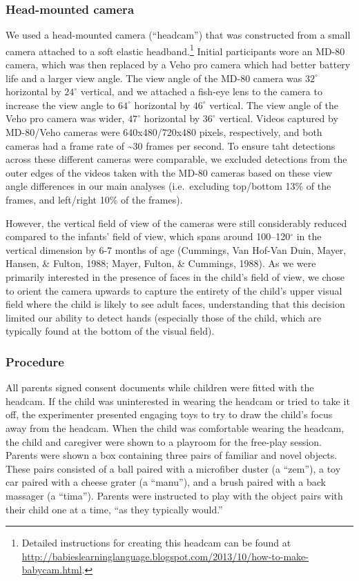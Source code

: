 \documentclass[english,man]{apa6}
\begin{document}
\subsubsection{Head-mounted camera}\label{head-mounted-camera}

We used a head-mounted camera (\enquote{headcam}) that was constructed
from a small camera attached to a soft elastic headband.\footnote{Detailed
  instructions for creating this headcam can be found at
  \url{http://babieslearninglanguage.blogspot.com/2013/10/how-to-make-babycam.html}.}
Initial participants wore an MD-80 camera, which was then replaced by a
Veho pro camera which had better battery life and a larger view angle.
The view angle of the MD-80 camera was \(32^{\circ}\) horizontal by
\(24^{\circ}\) vertical, and we attached a fish-eye lens to the camera
to increase the view angle to \(64^{\circ}\) horizontal by
\(46^{\circ}\) vertical. The view angle of the Veho pro camera was
wider, \(47^{\circ}\) horizontal by \(36^{\circ}\) vertical. Videos
captured by MD-80/Veho cameras were 640x480/720x480 pixels,
respectively, and both cameras had a frame rate of \textasciitilde{}30
frames per second. To ensure taht detections across these different
cameras were comparable, we excluded detections from the outer edges of
the videos taken with the MD-80 cameras based on these view angle
differences in our main analyses (i.e.~excluding top/bottom 13\% of the
frames, and left/right 10\% of the frames).

However, the vertical field of view of the cameras were still
considerably reduced compared to the infants' field of view, which spans
around 100--120\(^{\circ}\) in the vertical dimension by 6-7 months of
age (Cummings, Van Hof-Van Duin, Mayer, Hansen, \& Fulton, 1988; Mayer,
Fulton, \& Cummings, 1988). As we were primarily interested in the
presence of faces in the child's field of view, we chose to orient the
camera upwards to capture the entirety of the child's upper visual field
where the child is likely to see adult faces, understanding that this
decision limited our ability to detect hands (especially those of the
child, which are typically found at the bottom of the visual field).

\subsubsection{Procedure}\label{procedure}

All parents signed consent documents while children were fitted with the
headcam. If the child was uninterested in wearing the headcam or tried
to take it off, the experimenter presented engaging toys to try to draw
the child's focus away from the headcam. When the child was comfortable
wearing the headcam, the child and caregiver were shown to a playroom
for the free-play session. Parents were shown a box containing three
pairs of familiar and novel objects. These pairs consisted of a ball
paired with a microfiber duster (a \enquote{zem}), a toy car paired with
a cheese grater (a \enquote{manu}), and a brush paired with a back
massager (a \enquote{tima}). Parents were instructed to play with the
object pairs with their child one at a time, \enquote{as they typically
would.}
\end{document}
